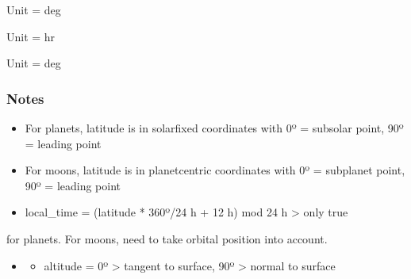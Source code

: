 \documentclass[letterpaper,10pt,english]{sphinxmanual}
\begin{document}
\begin{fulllineitems}
\begin{fulllineitems}
\pysigstartsignatures
\pysigline
{}
\pysigstopsignatures
\sphinxAtStartPar
Unit = deg

\end{fulllineitems}


\begin{fulllineitems}
\label{\detokenize{nexoclom2/nexoclom2.particle_tracking.starting_point_old:nexoclom2.particle_tracking.starting_point_old.StartingPoint.local_time}}
\pysigstartsignatures
\pysigline
{}
\pysigstopsignatures
\sphinxAtStartPar
Unit = hr

\end{fulllineitems}



\begin{fulllineitems}

\pysigstartsignatures
\pysigline
{}
\pysigstopsignatures
\sphinxAtStartPar
Unit = deg

\end{fulllineitems}

\subsubsection*{Notes}
\begin{itemize}
\item {} 
\sphinxAtStartPar
For planets, latitude is in solar\sphinxhyphen{}fixed coordinates with
0º = subsolar point, 90º = leading point

\item {} 
\sphinxAtStartPar
For moons, latitude is in planet\sphinxhyphen{}centric coordinates with
0º = subplanet point, 90º = leading point

\item {} 
\sphinxAtStartPar
local\_time = (latitude * 360º/24 h + 12 h) mod 24 h \sphinxhyphen{}\textgreater{} only true

\end{itemize}

\sphinxAtStartPar
for planets. For moons, need to take orbital position into account.
\begin{itemize}
\item {} \begin{description}
\begin{itemize}
\item {} 
\sphinxAtStartPar
altitude = 0º \sphinxhyphen{}\textgreater{} tangent to surface, 90º \sphinxhyphen{}\textgreater{} normal to surface


\end{itemize}
\end{description}
\end{itemize}
\end{fulllineitems}
\end{document}
